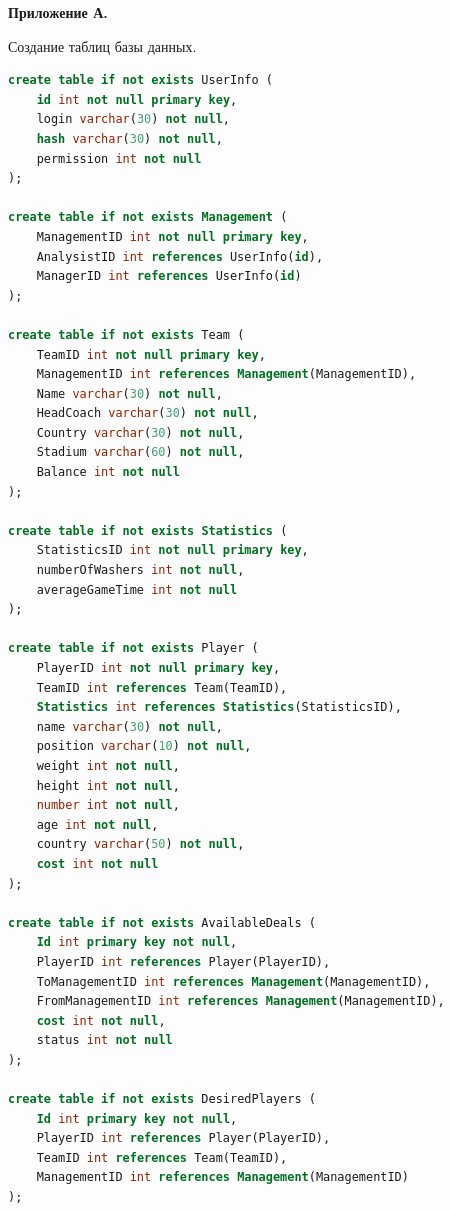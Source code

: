 \clearpage
{\centering\textbf{Приложение А.} \par}
{\centering Создание таблиц базы данных. \par}
\begin{lstlisting}[label={lst:appA}, language=SQL]
create table if not exists UserInfo (
	id int not null primary key,
	login varchar(30) not null,
	hash varchar(30) not null,
	permission int not null
);

create table if not exists Management (
	ManagementID int not null primary key,
	AnalysistID int references UserInfo(id),
	ManagerID int references UserInfo(id)
);

create table if not exists Team (
	TeamID int not null primary key,
	ManagementID int references Management(ManagementID),
	Name varchar(30) not null,
	HeadCoach varchar(30) not null,
	Country varchar(30) not null,
	Stadium varchar(60) not null,
	Balance int not null
);

create table if not exists Statistics (
	StatisticsID int not null primary key,
	numberOfWashers int not null,
	averageGameTime int not null
);

create table if not exists Player (
	PlayerID int not null primary key,
	TeamID int references Team(TeamID),
	Statistics int references Statistics(StatisticsID),
	name varchar(30) not null,
	position varchar(10) not null,
	weight int not null,
	height int not null,
	number int not null,
	age int not null,
	country varchar(50) not null,
	cost int not null
);

create table if not exists AvailableDeals (
	Id int primary key not null,
	PlayerID int references Player(PlayerID),
	ToManagementID int references Management(ManagementID),
	FromManagementID int references Management(ManagementID),
	cost int not null,
	status int not null
);

create table if not exists DesiredPlayers (
	Id int primary key not null,
	PlayerID int references Player(PlayerID),
	TeamID int references Team(TeamID),
	ManagementID int references Management(ManagementID)
); 
\end{lstlisting}


